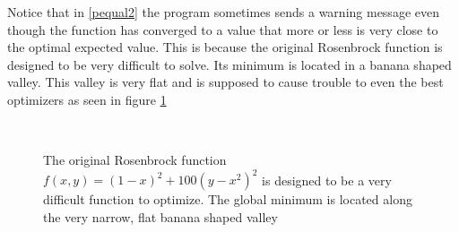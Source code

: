 Notice that in \ref{pequal2} the program sometimes sends a warning message even though the function has converged to a value that more or less is very close to the optimal expected value.  This is because the original Rosenbrock function is designed to be very difficult to solve.  Its minimum is located in a banana shaped valley. This valley is very flat and is supposed to cause trouble to even the best optimizers as seen in figure \ref{dualgraph}

\begin{figure}
\centering
\mbox{ \quad
{}}
\caption[Original Rosenbrock Function Mesh]{The original Rosenbrock function $f(x,y) = (1 - x)^2 + 100(y - x^2)^2$ is designed to be a very difficult function to optimize. The global minimum is located along the very narrow, flat banana shaped valley\citep{rosenbrock}}
\label{dualgraph}
\end{figure}

